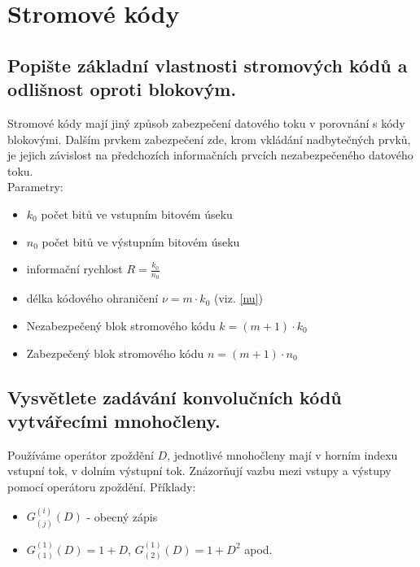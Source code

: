 \clearpage
\section{Stromové kódy}
\subsection{Popište základní vlastnosti stromových kódů a odlišnost oproti blokovým.}
Stromové kódy mají jiný způsob zabezpečení datového toku v porovnání s kódy blokovými. 
Dalším prvkem zabezpečení zde, krom vkládání nadbytečných prvků, je jejich závislost na předchozích 
informačních prvcích nezabezpečeného datového toku. \\
Parametry:
\begin{itemize}
    \item $k_0$ počet bitů ve vstupním bitovém úseku
    \item $n_0$ počet bitů ve výstupním bitovém úseku
    \item informační rychlost $R=\frac{k_0}{n_0}$
    \item délka kódového ohraničení $\nu=m\cdot k_0$ (viz. \ref{nu})
    \item Nezabezpečený blok stromového kódu $k=(m+1)\cdot k_0$
    \item Zabezpečený blok stromového kódu $n=(m+1)\cdot n_0$
\end{itemize}


\subsection{Vysvětlete zadávání konvolučních kódů vytvářecími mnohočleny.}
Používáme operátor zpoždění $D$, jednotlivé mnohočleny mají v horním indexu vstupní tok, v dolním výstupní tok.
Znázorňují vazbu mezi vstupy a výstupy pomocí operátoru zpoždění. Příklady:
\begin{itemize}
    \item $G^{(i)}_{(j)}(D)$ - obecný zápis
    \item $G^{(1)}_{(1)}(D)=1+D$, $G^{(1)}_{(2)}(D)=1+D^2$ apod.
\end{itemize} 

